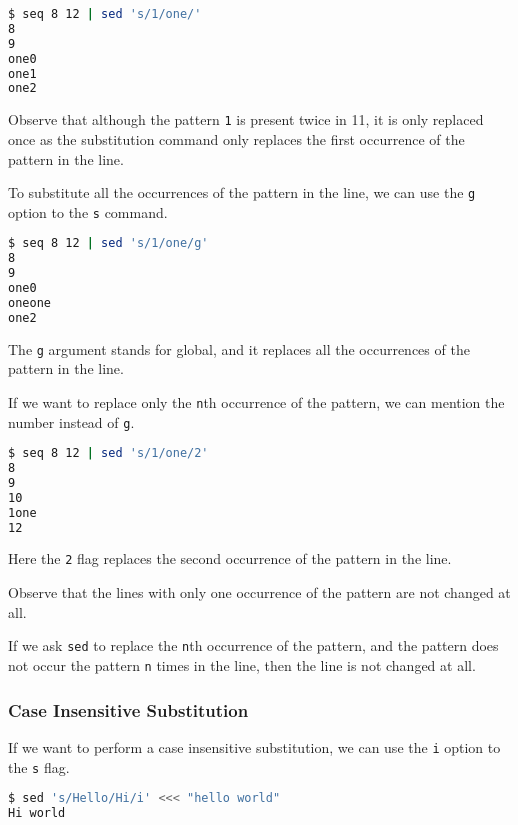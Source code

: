 \begin{lstlisting}[language=bash]
$ seq 8 12 | sed 's/1/one/'
8
9
one0
one1
one2
\end{lstlisting}

Observe that although the pattern \lstinline|1| is present twice in 11, it is only replaced once as the substitution command only replaces the first occurrence of the pattern in the line.

To substitute all the occurrences of the pattern in the line, we can use the \lstinline|g| option to the \lstinline|s| command.

\begin{lstlisting}[language=bash]
$ seq 8 12 | sed 's/1/one/g'
8
9
one0
oneone
one2
\end{lstlisting}

The \lstinline|g| argument stands for global, and it replaces all the occurrences of the pattern in the line.

If we want to replace only the \lstinline|n|th occurrence of the pattern, we can mention the number instead of \lstinline|g|.

\begin{lstlisting}[language=bash]
$ seq 8 12 | sed 's/1/one/2'
8
9
10
1one
12
\end{lstlisting}

Here the \lstinline|2| flag replaces the second occurrence of the pattern in the line.

Observe that the lines with only one occurrence of the pattern are not changed at all.

\begin{remark}
 If we ask \lstinline|sed| to replace the \lstinline|n|th occurrence of the pattern, and the pattern does not occur the pattern \lstinline|n| times in the line, then the line is not changed at all.
\end{remark}

\subsubsection{Case Insensitive Substitution}

If we want to perform a case insensitive substitution, we can use the \lstinline|i| option to the \lstinline|s| flag.

\begin{lstlisting}[language=bash]
$ sed 's/Hello/Hi/i' <<< "hello world"
Hi world
\end{lstlisting}

